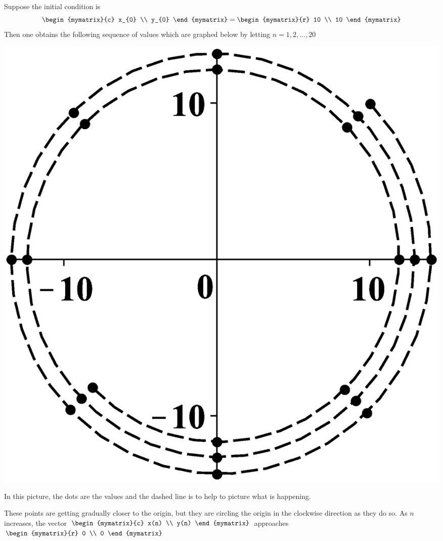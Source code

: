 \begin{solution}
Suppose the initial condition is
\begin{equation*}
\begin{mymatrix}{c}
x_{0} \\
y_{0}
\end{mymatrix} =\begin{mymatrix}{r}
10 \\
10
\end{mymatrix}
\end{equation*}
Then one obtains the following sequence of values which are graphed below by
letting $n=1,2,\ldots,20$

\begin{center}
\includegraphics[bb=0 0 800 800,scale=.2]{figures/4dec.eps}
\end{center}

In this picture, the dots are the values and the dashed line is to help to
picture what is happening.

These points are getting gradually closer to the origin, but they are
circling the origin in the clockwise direction as they do so. As $n$ increases,
the vector  $\begin{mymatrix}{c}
x(n) \\
y(n)
\end{mymatrix}$ approaches $ \begin{mymatrix}{r}
0 \\
0
\end{mymatrix}$
\end{solution}

